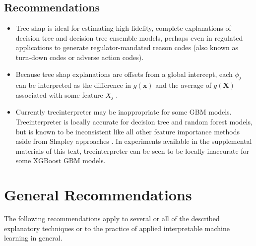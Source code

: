 \documentclass[11pt]{asaproc}
\begin{document}
\subsection{Recommendations}

\begin{itemize}
	
	\item Tree shap is ideal for estimating high-fidelity, complete explanations of decision tree and decision tree ensemble models, perhaps even in regulated applications to generate regulator-mandated reason codes (also known as turn-down codes or adverse action codes).
	
	\item Because tree shap explanations are offsets from a global intercept, each $\phi_j$ can be interpreted as the difference in $g(\mathbf{x})$ and the average of $g(\mathbf{X})$ associated with some feature $X_j$ \cite{molnar}. 
		
	\item Currently treeinterpreter may be inappropriate for some GBM models. Treeinterpreter is locally accurate for decision tree and random forest models, but is known to be inconsistent like all other feature importance methods aside from Shapley approaches \cite{tree_shap}. In experiments available in the supplemental materials of this text, treeinterpreter can be seen to be locally inaccurate for some XGBoost GBM models. 
	
\end{itemize}

\section{General Recommendations} \label{sec:gen_rec}

The following recommendations apply to several or all of the described explanatory techniques or to the practice of applied interpretable machine learning in general.
\end{document}
